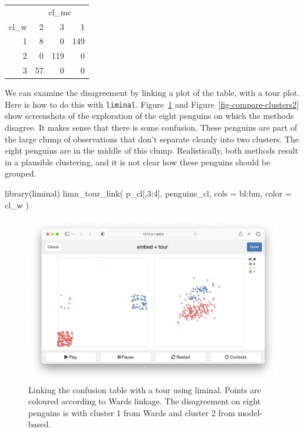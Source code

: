 \documentclass[
  letterpaper,
]{book}
\newenvironment{Shaded}{\begin{snugshade}}{\end{snugshade}}
\newcommand{\AttributeTok}[1]{\textcolor[rgb]{0.40,0.45,0.13}{#1}}
\newcommand{\DecValTok}[1]{\textcolor[rgb]{0.68,0.00,0.00}{#1}}
\newcommand{\FunctionTok}[1]{\textcolor[rgb]{0.28,0.35,0.67}{#1}}
\newcommand{\NormalTok}[1]{\textcolor[rgb]{0.00,0.23,0.31}{#1}}
\newcommand{\SpecialCharTok}[1]{\textcolor[rgb]{0.37,0.37,0.37}{#1}}
\begin{document}
\begin{longtable}{rrrr}
\toprule
 & \multicolumn{3}{c}{cl\_mc} \\ 
\cmidrule(lr){2-4}
cl\_w & 2 & 3 & 1 \\ 
\midrule
1 & 8 & 0 & 149 \\ 
2 & 0 & 119 & 0 \\ 
3 & 57 & 0 & 0 \\ 
\bottomrule
\end{longtable}

We can examine the disagreement by linking a plot of the table, with a
tour plot. Here is how to do this with \texttt{liminal}.
Figure~\ref{fig-compare-clusters1} and
Figure~\ref{fig-compare-clusters2} show screenshots of the exploration
of the eight penguins on which the methods disagree. It makes sense that
there is some confusion. These penguins are part of the large clump of
observations that don't separate cleanly into two clusters. The eight
penguins are in the middle of this clump. Realistically, both methods
result in a plausible clustering, and it is not clear how these penguins
should be grouped.

\begin{Shaded}
\begin{Highlighting}[]
\FunctionTok{library}\NormalTok{(liminal)}
\FunctionTok{limn\_tour\_link}\NormalTok{(}
\NormalTok{  p\_cl[,}\DecValTok{3}\SpecialCharTok{:}\DecValTok{4}\NormalTok{],}
\NormalTok{  penguins\_cl,}
  \AttributeTok{cols =}\NormalTok{ bl}\SpecialCharTok{:}\NormalTok{bm,}
  \AttributeTok{color =}\NormalTok{ cl\_w}
\NormalTok{)}
\end{Highlighting}
\end{Shaded}

\begin{figure}

{\centering \includegraphics{./images/compare-clusters1.png}

}

\caption{\label{fig-compare-clusters1}Linking the confusion table with a
tour using liminal. Points are coloured according to Wards linkage. The
disagreement on eight penguins is with cluster 1 from Wards and cluster
2 from model-based.}

\end{figure}
\end{document}
